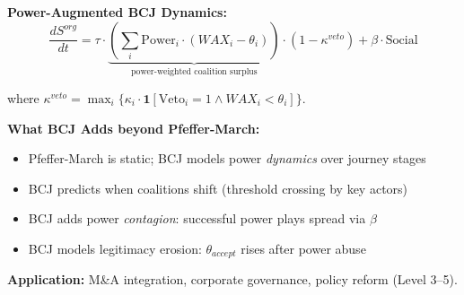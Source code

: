 \begin{tcolorbox}[colback=purple!5!white, colframe=purple!75!black,
    title=Theorem BCJ-T41: Power \& Politics as Special Case]
\textbf{Power-Augmented BCJ Dynamics:}
\begin{equation}
\frac{dS^{org}}{dt} = \tau \cdot \underbrace{\left(\sum_i \text{Power}_i \cdot (WAX_i - \theta_i)\right)}_{\text{power-weighted coalition surplus}} \cdot (1-\kappa^{veto}) + \beta \cdot \text{Social}
\end{equation}

where $\kappa^{veto} = \max_i \{\kappa_i \cdot \mathbf{1}[\text{Veto}_i = 1 \land WAX_i < \theta_i]\}$.

\textbf{What BCJ Adds beyond Pfeffer-March:}
\begin{itemize}[nosep]
\item Pfeffer-March is static; BCJ models power \textit{dynamics} over journey stages
\item BCJ predicts when coalitions shift (threshold crossing by key actors)
\item BCJ adds power \textit{contagion}: successful power plays spread via $\beta$
\item BCJ models legitimacy erosion: $\theta_{accept}$ rises after power abuse
\end{itemize}

\textbf{Application:} M\&A integration, corporate governance, policy reform (Level 3--5).
\end{tcolorbox}

